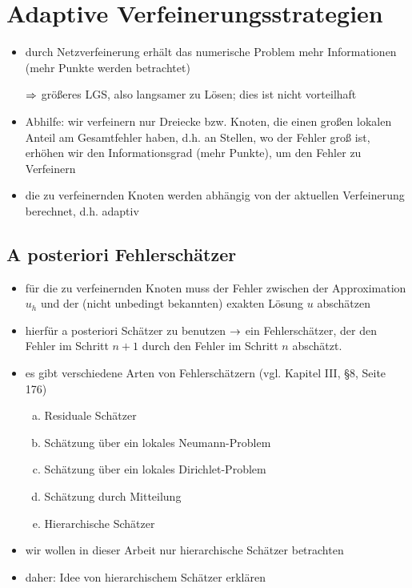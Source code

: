 \section{Adaptive Verfeinerungsstrategien}

\begin{itemize}
\item durch Netzverfeinerung erhält das numerische Problem mehr Informationen (mehr Punkte werden betrachtet)

\item[$\Rightarrow$]  größeres LGS, also langsamer zu Lösen; dies ist nicht vorteilhaft 

\item Abhilfe: wir verfeinern nur Dreiecke bzw. Knoten, die einen großen lokalen Anteil am Gesamtfehler haben, d.h. an Stellen, wo der Fehler groß ist, erhöhen wir den Informationsgrad (mehr Punkte), um den Fehler zu Verfeinern

\item die zu verfeinernden Knoten werden abhängig von der aktuellen Verfeinerung berechnet, d.h. adaptiv
\end{itemize}

\subsection{A posteriori Fehlerschätzer}

\begin{itemize}
\item für die zu verfeinernden Knoten muss der Fehler zwischen der Approximation $u_h$ und der (nicht unbedingt bekannten) exakten Lösung $u$ abschätzen

\item hierfür a posteriori Schätzer zu benutzen $\rightarrow$ ein Fehlerschätzer, der den Fehler im Schritt $n+1$ durch den Fehler im Schritt $n$ abschätzt.

\item es gibt verschiedene Arten von Fehlerschätzern (vgl. \cite{BraeFEM} Kapitel III, \S 8, Seite 176)
\begin{enumerate}[(a)]
\item Residuale Schätzer
\item Schätzung über ein lokales Neumann-Problem
\item Schätzung über ein lokales Dirichlet-Problem
\item Schätzung durch Mitteilung
\item Hierarchische Schätzer
\end{enumerate}

\item wir wollen in dieser Arbeit nur hierarchische Schätzer betrachten

\item daher: Idee von hierarchischem Schätzer erklären
\end{itemize}


